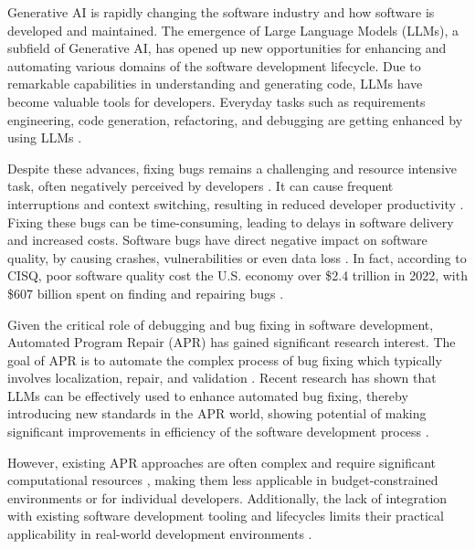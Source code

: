 Generative AI is rapidly changing the software industry and how software is developed and maintained. The emergence of Large Language Models (LLMs), a subfield of Generative AI, has opened up new opportunities for enhancing and automating various domains of the software development lifecycle. Due to remarkable capabilities in understanding and generating code, LLMs have become valuable tools for developers. Everyday tasks such as requirements engineering, code generation, refactoring, and debugging are getting enhanced by using LLMs \cite{houLargeLanguageModels2024, puvvadiCodingAgentsComprehensive2025}.

Despite these advances, fixing bugs remains a challenging and resource intensive task, often negatively perceived by developers  \cite{winterHowDevelopersReally2023}. It can cause frequent interruptions and  context switching, resulting in reduced developer productivity  \cite{vasilescuSkyNotLimit2016}. Fixing these bugs can be time-consuming, leading to delays in software delivery and increased costs. %
Software bugs have direct negative impact on software quality, by causing crashes, vulnerabilities or even data loss \cite{tihanyiNewEraSoftware2024}.
In fact, according to CISQ, poor software quality cost the U.S. economy over \$2.4 trillion in 2022, with \$607 billion spent on finding and repairing bugs \cite{CostPoorSoftware}.

Given the critical role of debugging and bug fixing in software development, Automated Program Repair (APR) has gained significant research interest. The goal of APR is to automate the complex process of bug fixing \cite{houLargeLanguageModels2024} which typically involves localization, repair, and validation \cite{zhangEmpiricalStudyFactors2012, leeUnifiedDebuggingApproach2024,xiaAgentlessDemystifyingLLMbased2024,zhangPATCHEmpoweringLarge2025, wangEmpiricalResearchUtilizing2025}.
Recent research has shown that LLMs can be effectively used to enhance automated bug fixing, thereby introducing new standards in the APR world, showing potential of making significant improvements in efficiency of the software development process \cite{xiaAgentlessDemystifyingLLMbased2024,liuMarsCodeAgentAInative2024,yangSWEagentAgentComputerInterfaces2024, sobaniaAnalysisAutomaticBug2023, xiaAutomatedProgramRepair2024, huCanGPTO1Kill2024}.

However, existing APR approaches are often complex and require significant computational resources \cite{rondonEvaluatingAgentbasedProgram2025}, making them less applicable in budget-constrained environments or for individual developers. Additionally, the lack of integration with existing software development tooling and lifecycles limits their practical applicability in real-world development environments \cite{chenUnveilingPitfallsUnderstanding2025,liuMarsCodeAgentAInative2024}.

